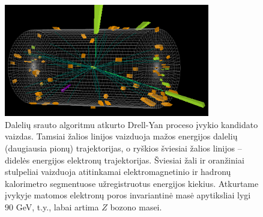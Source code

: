 \documentclass[a4paper, 12pt, oneside]{article}
\begin{document}
\begin{figure}[t]
	\includegraphics[width=0.8\textwidth]{Event.png}
	\caption{\label{fig:Event}
		Dalelių srauto algoritmu atkurto Drell-Yan proceso įvykio kandidato vaizdas.
		Tamsiai žalios linijos vaizduoja mažos energijos dalelių (daugiausia pionų) trajektorijas,
		o ryškios šviesiai žalios linijos -- didelės energijos elektronų trajektorijas.
		Šviesiai žali ir oranžiniai stulpeliai vaizduoja atitinkamai elektromagnetinio ir hadronų kalorimetro
		segmentuose užregistruotus energijos kiekius.
		Atkurtame įvykyje matomos elektronų poros invariantinė masė apytiksliai lygi $90$ GeV, t.y., labai artima $Z$ bozono masei.
	}
\end{figure}
\end{document}
